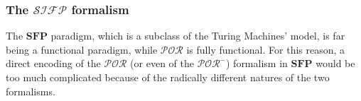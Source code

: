 \documentclass[10pt]{amsart}
\newcommand{\POLY}{\mathsf{POLY}}
\newcommand{\SFP}{\mathbf{SFP}}
\newcommand{\POR}{\mathcal{POR}}
\newcommand{\SIFP}{\mathcal{SIFP}}
\newcommand{\vone}{x}
\newcommand{\oone}{\omega}
\newcommand{\BRS}{\mathcal{BRS}}
\begin{document}
\begin{comment}
\item In the case of iteration, by IH we know that $\exists p_g \in \POLY.\forall q_g \in \POLY. p_q \lesssim q_g \to g(\vone_1, \ldots, \vone_k, \oone)= g'(\vone_1, \ldots, \vone_k, \oone_{q_g(|\vone_1|, \ldots, |\vone_k|)})$ with $g' \in \POR^-$ is bounded by a polynomial $p_g$ in its inputs. Similarly, we know that $\exists p_0, p_1 \in \POLY.\forall q_0, q_1 \in \POLY. p_0 \lesssim q_0 \land p_1 \lesssim q_1 \to h_0(\vone_1, \ldots, \vone_k, \vone_{k+1}, \oone)= h_0'(\vone_1, \ldots, \vone_k, \vone_{k+1}, \oone_{q_0(|\vone_1|, \ldots, |\vone_k|, |\vone_{k+1}|)}) \land h_1(\vone_1, \ldots, \vone_k,  \vone_{k+1}, \oone)= h_1'(\vone_1, \ldots, \vone_k,\vone_{k+1},  \oone_{p_1(|\vone_1|, \ldots, |\vone_k|, |\vone_{k+1}|)})$. Similarly to what we did previously, we use lemma \ref{lemma:sizeofpor} in order to obtain an upper bound to the size of the recursive call that allows us to express $p_0$ and $p_1$ in function of $\vone_1, \ldots, \vone_k$. Call the polynomials that we obtain $p_0'$ and $p_1'$. now we can produce an polynomial universally greater that the one that we obtained simply applying \ref{lemma:greaterpoly}, obtaining $p$. This allows us to use all the IHs and to conclude the sub-derivation.
\end{itemize}
\end{proof}

At this point, the proof of final result is intuitively concluded. The $\POR^-$ formalism coincides to the Ferreira's $\BRS$ (Ferreira90). The authors of the above mentioned paper claimed such formalism to be polynomially interpretable by a single tape Turing's Machine, which is a particular class of a $\SFP$ machine. Unfortunately, as far as the authors of this paper know, the proof of such result is unavailable.

For this reason, and for the sake of producing a comprehensive and self-contained work, we decided to prove explicitly that the $\POR^-$ formalism can be interpreted by a single tape Turing's Machine with polynomial complexity.
\end{comment}

\subsubsection{The $\SIFP$ formalism}

The $\SFP$ paradigm, which is a subclass of the Turing Machines' model, is far being a functional paradigm, while $\POR$ is fully functional. For this reason, a direct encoding of the $\POR$ (or even of the $\POR^-$) formalism in $\SFP$ would be too much complicated because of the radically different natures of the two formalisms.
\end{document}
